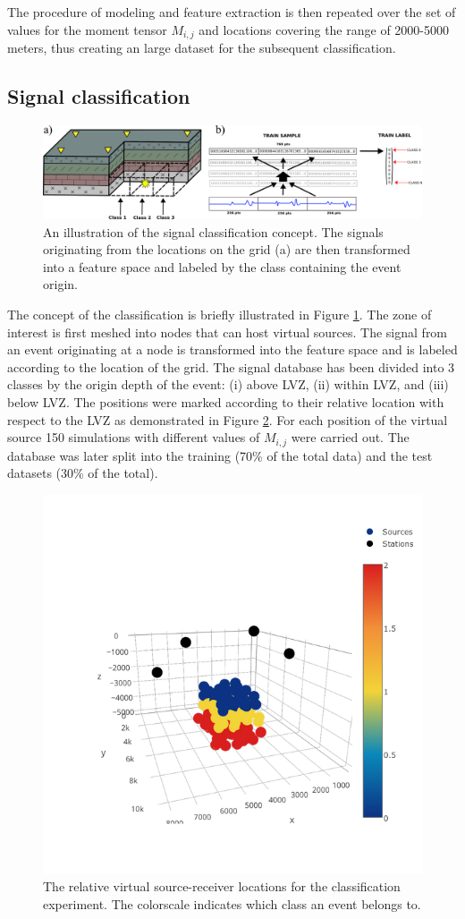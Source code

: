 \documentclass[letterpaper,11pt]{article}
\begin{document}
The procedure of modeling and feature extraction is then repeated over the set of values for the moment tensor $M_{i,j}$ and locations covering the range of 2000-5000 meters, thus creating an large dataset for the subsequent classification.
\subsection*{Signal classification}
\begin{figure}[htb]
\begin{center}
\includegraphics[width=0.7\linewidth,angle=0]{./AntonBiryukov_bibtex/classes.png}
\end{center}
\vspace{-4mm}
\caption{An illustration of the signal classification concept. The signals originating from the locations on the grid (a) are then transformed into a feature space and labeled by the class containing the event origin.}
\label{fig:classes}
\end{figure}
The concept of the classification is briefly illustrated in Figure \ref{fig:classes}. The zone of interest is first meshed into nodes that can host virtual sources. The signal from an event originating at a node is transformed into the feature space and is labeled according to the location of the grid. The signal database has been divided into 3 classes by the origin depth of the event: (i) above LVZ, (ii) within LVZ, and (iii) below LVZ. The positions were marked according to their relative location with respect to the LVZ as demonstrated in Figure \ref{fig:foxcreek_classes}. For each position of the virtual source 150 simulations with different values of $M_{i,j}$ were carried out. The database was later split into the training (70\% of the total data) and the test datasets (30\% of the total). 

\begin{figure}[b!]
\begin{center}
\includegraphics[width=0.3\linewidth,angle=0]{./AntonBiryukov_bibtex/figure_foxcreek_classes.png}
\end{center}
\vspace{-4mm}
\caption{The relative virtual source-receiver locations for the classification experiment. The colorscale indicates which class an event belongs to.}
\label{fig:foxcreek_classes}
\end{figure}
\end{document}
